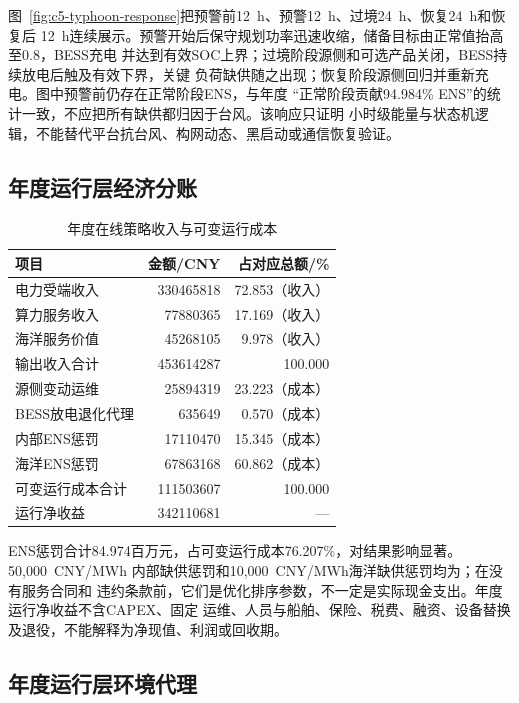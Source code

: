 图~\ref{fig:c5-typhoon-response}把预警前12~h、预警12~h、过境24~h、恢复24~h和恢复后
12~h连续展示。预警开始后保守规划功率迅速收缩，储备目标由正常值抬高至0.8，BESS充电
并达到有效SOC上界；过境阶段源侧和可选产品关闭，BESS持续放电后触及有效下界，关键
负荷缺供随之出现；恢复阶段源侧回归并重新充电。图中预警前仍存在正常阶段ENS，与年度
“正常阶段贡献94.984\% ENS”的统计一致，不应把所有缺供都归因于台风。该响应只证明
小时级能量与状态机逻辑，不能替代平台抗台风、构网动态、黑启动或通信恢复验证。

\subsection{年度运行层经济分账}

\begin{table}[htbp]
\centering
\caption{年度在线策略收入与可变运行成本}
\label{tab:c5-annual-economics}
\begin{tabular}{lrr}
\toprule
项目 & 金额/CNY & 占对应总额/\%\\
\midrule
电力受端收入 & 330465818 & 72.853（收入）\\
算力服务收入 & 77880365 & 17.169（收入）\\
海洋服务价值 & 45268105 & 9.978（收入）\\
输出收入合计 & 453614287 & 100.000\\
\midrule
源侧变动运维 & 25894319 & 23.223（成本）\\
BESS放电退化代理 & 635649 & 0.570（成本）\\
内部ENS惩罚 & 17110470 & 15.345（成本）\\
海洋ENS惩罚 & 67863168 & 60.862（成本）\\
可变运行成本合计 & 111503607 & 100.000\\
\midrule
运行净收益 & 342110681 & ---\\
\bottomrule
\end{tabular}
\end{table}

ENS惩罚合计84.974百万元，占可变运行成本76.207\%，对结果影响显著。50,000~CNY/MWh
内部缺供惩罚和10,000~CNY/MWh海洋缺供惩罚均为\assumptiontag；在没有服务合同和
违约条款前，它们是优化排序参数，不一定是实际现金支出。年度运行净收益不含CAPEX、固定
运维、人员与船舶、保险、税费、融资、设备替换及退役，不能解释为净现值、利润或回收期。

\subsection{年度运行层环境代理}


